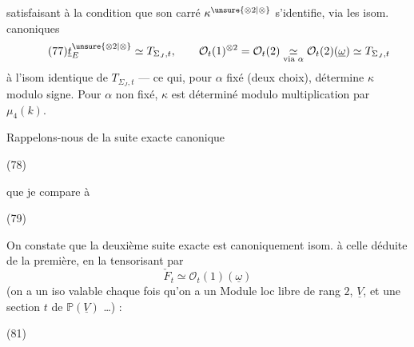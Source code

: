 satisfaisant à la condition que son carré $\kappa^{\unsure{\otimes2|\otimes}}$ s'identifie, via les isom. canoniques
\[
\tag{77}
\underline{t}_E^{\unsure{\otimes2|\otimes}}\simeq T_{\Sigma_J,t},
\qquad
\mathcal O_t(1)^{\otimes2}=\mathcal O_t(2)
\underset{\text{via }\alpha}{\simeq}
\mathcal O_t(2)(\underline{\omega})\simeq T_{\Sigma_J,t}
\]
à l'isom identique de $T_{\Sigma_J,t}$ --- ce qui, pour $\alpha$ fixé (deux choix), détermine $\kappa$ modulo signe. Pour $\alpha$ non fixé, $\kappa$ est déterminé modulo multiplication par $\mu_4(k)$.

Rappelons-nous de la suite exacte canonique

(78)

que  je compare à

(79)

On constate que la deuxième suite exacte est canoniquement isom. à celle déduite de la première, en la tensorisant par
\[
\tag{80}
\check F_t\simeq\mathcal O_t(1)(\underline{\omega})
\]
(on a un iso valable chaque fois qu'on a un Module loc libre de rang $2$, $\underline V$,  et une section $t$ de $\mathbb P(\underline V)$ \ldots) :

 (81)

